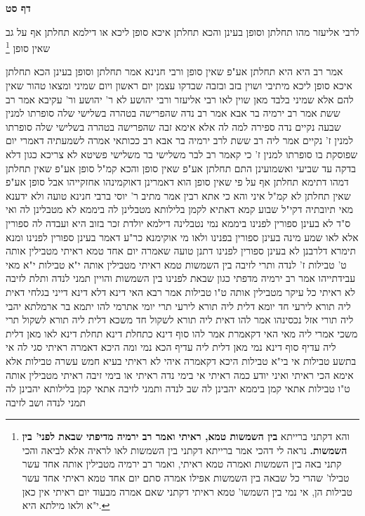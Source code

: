 \documentclass[12pt, openany]{book}
\newcommand{\sethebfont}{
\fontsize{10.5pt}{21.0pt} \selectfont
}
\newcommand{\twocol}[1]{
	{\sethebfont \begin{multicols}{2}
			#1
	\end{multicols}}	
}
\newcommand{\sectname}{}
\newcommand{\newsection}[1]{
	\addcontentsline{toc}{section}{#1}
	\renewcommand{\sectname}{#1}	
	\vspace{-\baselineskip}
	\begin{center}
		\textbf{%
\fontsize{16pt}{16pt}\selectfont
			#1}
	\end{center}
	\vspace{-\baselineskip}
	\nopagebreak
}
\newcommand{\footnotecomment}[1]{\footnote{#1}}
\newcommand{\commenta}[1]{\footnotecomment{#1}}
\begin{document}
\newsection{דף סט}
\twocol{לרבי אליעזר מהו  תחלתן וסופן בעינן והכא תחלתן איכא סופן ליכא  או דילמא תחלתן אף על גב שאין סופן 
\commenta{והא דקתני ברייתא \textbf{בין השמשות טמא, ראיתי ואמר רב ירמיה מדיפתי שבאת לפני' בין השמשות.}  נראה לי דהכי אמר ברייתא דקתני בין השמשות לאו לראיה אלא לביאה והכי קתני באה בין השמשות ואמרה טמא ראיתי, ואמר רב ירמיה מטבילין אותה אחד עשר טבילו' שהרי כל שבאה בין השמשות אפילו אמרה סתם יום אחד טמא ראיתי אחד עשר טבילות הן, אי נמי בין השמשו' טמא ראיתי דקתני שאם אמרה מבעוד יום ראיתי אין כאן י"א ולאו מילתא היא. }

אמר רב  היא היא תחלתן אע"פ שאין סופן  ורבי חנינא אמר  תחלתן וסופן בעינן הכא תחלתן איכא סופן ליכא 
מיתיבי  ושוין בזב ובזבה שבדקו עצמן יום ראשון ויום שמיני ומצאו טהור שאין להם אלא שמיני בלבד  מאן שוין  לאו רבי אליעזר ורבי יהושע 
לא ר' יהושע ור' עקיבא 
אמר רב ששת אמר רב ירמיה בר אבא אמר רב  נדה שהפרישה בטהרה בשלישי שלה סופרתו למנין שבעה נקיים 
נדה ספירה למה לה  אלא אימא  זבה שהפרישה בטהרה בשלישי שלה סופרתו למנין ז' נקיים 
אמר ליה רב ששת לרב ירמיה בר אבא  רב ככותאי אמרה לשמעתיה דאמרי יום שפוסקת בו סופרתו למנין ז' 
כי קאמר רב לבר משלישי  בר משלישי פשיטא  לא צריכא כגון דלא בדקה עד שביעי
ואשמועינן התם תחלתן אע"פ שאין סופן והכא קמ"ל סופן אע"פ שאין תחלתן 
דמהו דתימא  תחלתן אף על פי שאין סופן הוא דאמרינן דאוקמינהו אחזקייהו אבל סופן אע"פ שאין תחלתן לא קמ"ל 
איני והא כי אתא רבין אמר  מתיב ר' יוסי ברבי חנינא טועה
ולא ידענא מאי תיובתיה  דקי"ל שבוע קמא דאתיא לקמן בלילותא מטבלינן לה ביממא לא מטבלינן לה 
ואי ס"ד לא בעינן ספורין לפנינו ביממא נמי נטבלינה דילמא יולדת זכר בזוב היא ועבדה לה ספורין  אלא לאו שמע מינה בעינן ספורין בפנינו 
ולאו מי אוקימנא כר"ע דאמר בעינן ספורין לפנינו 
ומנא תימרא דלרבנן לא בעינן ספורין לפנינו דתנן  טועה שאמרה יום אחד טמא ראיתי מטבילין אותה ט' טבילות
ז' לנדה ותרי לזיבה  בין השמשות טמא ראיתי מטבילין אותה י"א טבילות 
י"א מאי עבידתייהו  אמר רב ירמיה מדפתי  כגון שבאת לפנינו בין השמשות
והויין תמני לנדה ותלת לזיבה 
לא ראיתי כל עיקר מטבילין אותה ט"ו טבילות  אמר רבא  האי דינא דלא דינא דייני בגלחי דאית ליה תורא לירעי חד יומא דלית ליה תורא לירעי תרי יומי 
אתרמי להו יתמא בר ארמלתא יהבי ליה תורי אזל נכסינהו  אמר להו  דאית ליה תורא לשקול חד משכא דלית ליה תורא לשקול תרי משכי  אמרי ליה  מאי האי דקאמרת  אמר להו  סוף דינא כתחלת דינא  תחלת דינא לאו מאן דלית ליה עדיף  סוף דינא נמי מאן דלית ליה עדיף 
הכא נמי ומה היכא דאמרה ראיתי סגי לה אי בתשע טבילות אי בי"א טבילות היכא דקאמרה איהי לא ראיתי בעיא חמש עשרה טבילות 
אלא אימא הכי  ראיתי ואיני יודע כמה ראיתי אי בימי נדה ראיתי או בימי זיבה ראיתי מטבילין אותה ט"ו טבילות  אתאי קמן ביממא יהבינן לה שב לנדה
ותמני לזיבה אתאי קמן בלילותא יהבינן לה תמני לנדה ושב לזיבה
}
\end{document}
